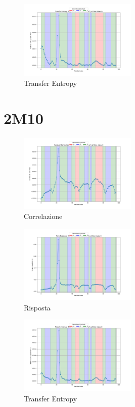 \documentclass{article}
\begin{document}
\begin{figure}[H]
    \centering
    \includegraphics[width=0.5\textwidth]{"images/2m0zTransfer Entropy TE_ij for i=22 as a function of j at time index 0.png"}
    \caption{Transfer Entropy}
\end{figure}

\section{2M10}
\begin{figure}[H]
    \centering                            
    \includegraphics[width=0.5\textwidth]{"images/2m10Residual Correlation C_ij for i=22 as a function of j at time index 0.png"}
    \caption{Correlazione}
\end{figure}
\begin{figure}[H]
    \centering
    \includegraphics[width=0.5\textwidth]{"images/2m10Time Response R_ij for i=22 as a function of j at time index 0.png"}
    \caption{Risposta}
\end{figure}

\begin{figure}[H]
    \centering
    \includegraphics[width=0.5\textwidth]{"images/2m10Transfer Entropy TE_ij for i=22 as a function of j at time index 0.png"}
    \caption{Transfer Entropy}
\end{figure}
\end{document}
